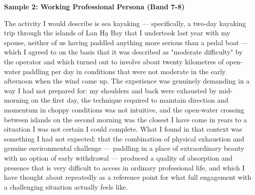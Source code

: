 \begin{ieltsanswer}
\textbf{Sample 2: Working Professional Persona (Band 7-8)}

The activity I would describe is sea kayaking — specifically, a two-day kayaking trip through the islands of Lan Hạ Bay that I undertook last year with my spouse, neither of us having paddled anything more serious than a pedal boat — which I agreed to on the basis that it was described as "moderate difficulty" by the operator and which turned out to involve about twenty kilometres of open-water paddling per day in conditions that were not moderate in the early afternoon when the wind came up. The experience was genuinely demanding in a way I had not prepared for: my shoulders and back were exhausted by mid-morning on the first day, the technique required to maintain direction and momentum in choppy conditions was not intuitive, and the open-water crossing between islands on the second morning was the closest I have come in years to a situation I was not certain I could complete. What I found in that context was something I had not expected: that the combination of physical exhaustion and genuine environmental challenge — paddling in a place of extraordinary beauty with no option of early withdrawal — produced a quality of absorption and presence that is very difficult to access in ordinary professional life, and which I have thought about repeatedly as a reference point for what full engagement with a challenging situation actually feels like.
\end{ieltsanswer}


